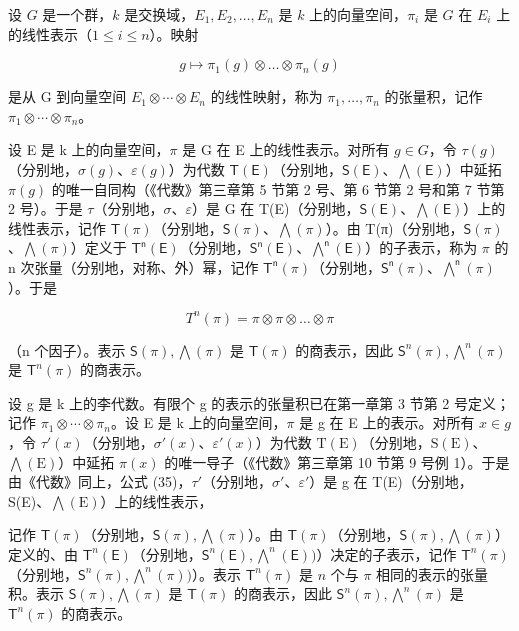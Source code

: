

设 \(G\) 是一个群，\(k\) 是交换域，\(E_1, E_2, \ldots, E_n\) 是 \(k\) 上的向量空间，\(\pi_i\) 是 \(G\) 在 \(E_i\) 上的线性表示（\(1 \leqslant i \leqslant n\)）。映射

\[
g \mapsto \pi_ {1} (g) \otimes \dots \otimes \pi_ {n} (g)
\]

是从 G 到向量空间 \(E_{1} \otimes \cdots \otimes E_{n}\) 的线性映射，称为 \(\pi_{1}, \ldots, \pi_{n}\) 的张量积，记作 \(\pi_{1} \otimes \cdots \otimes \pi_{n}\)。

设 E 是 k 上的向量空间，\(\pi\) 是 G 在 E 上的线性表示。对所有 \(g \in G\)，令 \(\tau(g)\)（分别地，\(\sigma(g)\)、\(\varepsilon(g)\)）为代数 \(\mathsf{T}(\mathsf{E})\)（分别地，\(\mathsf{S}(\mathsf{E})\)、\(\bigwedge(\mathsf{E})\)）中延拓 \(\pi(g)\) 的唯一自同构（《代数》第三章第 5 节第 2 号、第 6 节第 2 号和第 7 节第 2 号）。于是 \(\tau\)（分别地，\(\sigma\)、\(\varepsilon\)）是 G 在 T(E)（分别地，\(\mathsf{S}(\mathsf{E})\)、\(\bigwedge(\mathsf{E})\)）上的线性表示，记作 \(\mathsf{T}(\pi)\)（分别地，\(\mathsf{S}(\pi)\)、\(\bigwedge(\pi)\)）。由 T(π)（分别地，\(\mathsf{S}(\pi)\)、\(\bigwedge(\pi)\)）定义于 \(\mathsf{T}^{\mathsf{n}}(\mathsf{E})\)（分别地，\(\mathsf{S}^{\mathsf{n}}(\mathsf{E})\)、\(\bigwedge^{\mathsf{n}}(\mathsf{E})\)）的子表示，称为 \(\pi\) 的 n 次张量（分别地，对称、外）幂，记作 \(\mathsf{T}^{\mathsf{n}}(\pi)\)（分别地，\(\mathsf{S}^{\mathsf{n}}(\pi)\)、\(\bigwedge^{\mathsf{n}}(\pi)\)）。于是

\[
T ^ {n} (\pi) = \pi \otimes \pi \otimes \dots \otimes \pi
\]

（n 个因子）。表示 \(\mathsf{S}(\pi), \bigwedge (\pi)\) 是 \(\mathsf{T}(\pi)\) 的商表示，因此 \(\mathsf{S}^n (\pi), \bigwedge^n (\pi)\) 是 \(\mathsf{T}^n (\pi)\) 的商表示。

设 g 是 k 上的李代数。有限个 g 的表示的张量积已在第一章第 3 节第 2 号定义；记作 \(\pi_{1}\otimes\cdots\otimes\pi_{n}\)。设 E 是 k 上的向量空间，\(\pi\) 是 g 在 E 上的表示。对所有 \(x\in g\)，令 \(\tau'(x)\)（分别地，\(\sigma'(x)\)、\(\varepsilon'(x)\)）为代数 \(\mathrm{T(E)}\)（分别地，\(\mathrm{S(E)}\)、\(\bigwedge(\mathrm{E})\)）中延拓 \(\pi(x)\) 的唯一导子（《代数》第三章第 10 节第 9 号例 1）。于是由《代数》同上，公式 (35)，\(\tau'\)（分别地，\(\sigma'\)、\(\varepsilon'\)）是 g 在 T(E)（分别地，S(E)、\(\bigwedge(\mathrm{E})\)）上的线性表示，

记作 \(\mathsf{T}(\pi)\)（分别地，\(\mathsf{S}(\pi),\bigwedge (\pi)\)）。由 \(\mathsf{T}(\pi)\)（分别地，\(\mathsf{S}(\pi),\bigwedge (\pi)\)）定义的、由 \(\mathsf{T}^n (\mathsf{E})\)（分别地，\(\mathsf{S}^n (\mathsf{E}),\bigwedge^n (\mathsf{E}))\)）决定的子表示，记作 \(\mathsf{T}^n (\pi)\)（分别地，\(\mathsf{S}^n (\pi),\bigwedge^n (\pi))\)）。表示 \(\mathsf{T}^n (\pi)\) 是 \(n\) 个与 \(\pi\) 相同的表示的张量积。表示 \(\mathsf{S}(\pi),\bigwedge (\pi)\) 是 \(\mathsf{T}(\pi)\) 的商表示，因此 \(\mathsf{S}^n (\pi),\bigwedge^n (\pi)\) 是 \(\mathsf{T}^n (\pi)\) 的商表示。

